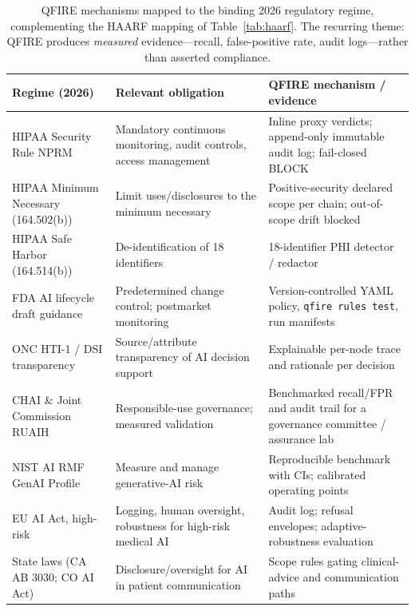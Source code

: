 \documentclass[11pt]{article}
\newcommand{\rev}[1]{#1}
\begin{document}
\begin{table}[htbp]\centering\small
\begin{tabular}{L{3.6cm}L{4.2cm}L{4.6cm}}
\toprule
Regime (2026) & Relevant obligation & QFIRE mechanism / evidence \\
\midrule
HIPAA Security Rule NPRM~\cite{hipaa_nprm2025} & Mandatory continuous monitoring, audit controls, access management & Inline proxy verdicts; append-only immutable audit log; fail-closed BLOCK \\
HIPAA Minimum Necessary (164.502(b)) & Limit uses/disclosures to the minimum necessary & Positive-security declared scope per chain; out-of-scope drift blocked \\
HIPAA Safe Harbor (164.514(b))~\cite{hipaa_safe_harbor} & De-identification of 18 identifiers & 18-identifier PHI detector / redactor \\
FDA AI lifecycle draft guidance~\cite{fda_aielifecycle2025} & Predetermined change control; postmarket monitoring & Version-controlled YAML policy, \texttt{qfire rules test}, run manifests \\
ONC HTI-1 / DSI transparency~\cite{onc_hti1} & Source/attribute transparency of AI decision support & Explainable per-node trace and rationale per decision \\
CHAI \& Joint Commission RUAIH~\cite{chai_jc_ruaih2025} & Responsible-use governance; measured validation & Benchmarked recall/FPR and audit trail for a governance committee / assurance lab \\
NIST AI RMF GenAI Profile~\cite{nist_genai2024} & Measure and manage generative-AI risk & Reproducible benchmark with CIs; calibrated operating points \\
EU AI Act, high-risk~\cite{eu_ai_act2024} & Logging, human oversight, robustness for high-risk medical AI & Audit log; refusal envelopes; adaptive-robustness evaluation \\
State laws (CA AB 3030; CO AI Act)~\cite{ca_ab3030,co_ai_act} & Disclosure/oversight for AI in patient communication & Scope rules gating clinical-advice and communication paths \\
\bottomrule
\end{tabular}
\caption{\rev{QFIRE mechanisms mapped to the binding 2026 regulatory regime,
complementing the HAARF mapping of Table~\ref{tab:haarf}. The recurring theme:
QFIRE produces \emph{measured} evidence---recall, false-positive rate, audit
logs---rather than asserted compliance.}}
\label{tab:regmap}
\end{table}
\end{document}
